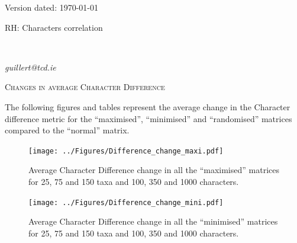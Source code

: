\documentclass[12pt,letterpaper]{article}
\renewcommand{\section}[1]{%
\bigskip
\begin{center}
\begin{Large}
\normalfont\scshape #1
\medskip
\end{Large}
\end{center}}
\begin{document}
\begin{flushright}
Version dated: \today
\end{flushright}
\bigskip
\noindent RH: Characters correlation

\bigskip
\medskip
\begin{center}

\bigskip


\bigskip

\\

\end{center}
\medskip
{} \textit{guillert@tcd.ie}\\ 
\vspace{1in}


\newpage

\section{Changes in average Character Difference}

The following figures and tables represent the average change in the Character difference metric for the ``maximised'', ``minimised'' and ``randomised'' matrices compared to the ``normal'' matrix.

\begin{figure}[!htbp]
\centering
   \texttt{[image: ../Figures/Difference\_change\_maxi.pdf]}
\caption{Average Character Difference change in all the ``maximised'' matrices for 25, 75 and 150 taxa and 100, 350 and 1000 characters.}
\end{figure}

\begin{figure}[!htbp]
\centering
   \texttt{[image: ../Figures/Difference\_change\_mini.pdf]}
\caption{Average Character Difference change in all the ``minimised'' matrices for 25, 75 and 150 taxa and 100, 350 and 1000 characters.}
\end{figure}
\end{document}
